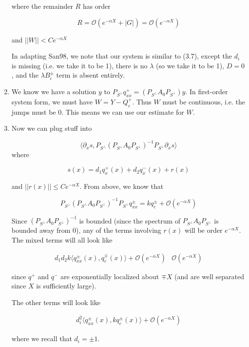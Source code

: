 \documentclass[12pt]{article}
\begin{document}
\begin{enumerate}
where the remainder $R$ has order

\[
R = \mathcal{O}(e^{-\alpha X} + |G|) = \mathcal{O}(e^{-\alpha X}) 
\]

and $||W|| < C e^{-\alpha X}$

In adapting San98, we note that our system is similar to (3.7), except the $d_i$ is missing (i.e. we take it to be 1), there is no $\lambda$ (so we take it to be 1), $D = 0$, and the $\lambda B_i^\pm$ term is absent entirely.

\item We know we have a solution $y$ to $P_{S^\perp} q^+_{xx} = (P_{S^\perp} A_0 P_{S^\perp}) y$. In first-order system form, we must have $W = Y - Q^+_c$. Thus $W$ must be continuous, i.e. the jumps must be 0. This means we can use our estimate for $W$.

\item Now we can plug stuff into 

\[
\langle \partial_x s, P_{S^\perp} (P_{S^\perp} A_0 P_{S^\perp})^{-1} P_{S^\perp} \partial_x s \rangle
\]
where 

\[
s(x) = d_1 q^+_x(x) + d_2 q^-_x(x) + r(x)
\]

and $||r(x)|| \leq C e^{-\alpha X}$. From above, we know that

\[
P_{S^\perp} (P_{S^\perp} A_0 P_{S^\perp})^{-1} P_{S^\perp} q^\pm_{xx} = k q^\pm_c + \mathcal{O}(e^{-\alpha X})
\]


Since $(P_{S^\perp} A_0 P_{S^\perp})^{-1}$ is bounded (since the spectrum of $P_{S^\perp} A_0 P_{S^\perp}$ is bounded away from 0), any of the terms involving $r(x)$ will be order $e^{-\alpha X}$. The mixed terms will all look like

\begin{align*}
d_1 d_2 k \langle q^\pm_{xx}(x), q^\mp_c(x) \rangle + \mathcal{O}(e^{-\alpha X})
& \mathcal{O}(e^{-\alpha X}) 
\end{align*}

since $q^+$ and $q^-$ are exponentially localized about $\mp X$ (and are well separated since $X$ is sufficiently large).

The other terms will look like 

\begin{align*}
d_i^2 \langle q^\pm_{xx}(x), k q^\pm_c(x) \rangle + \mathcal{O}(e^{-\alpha X}) 
\end{align*}

where we recall that $d_i = \pm 1$.





\end{enumerate}
\end{document}

